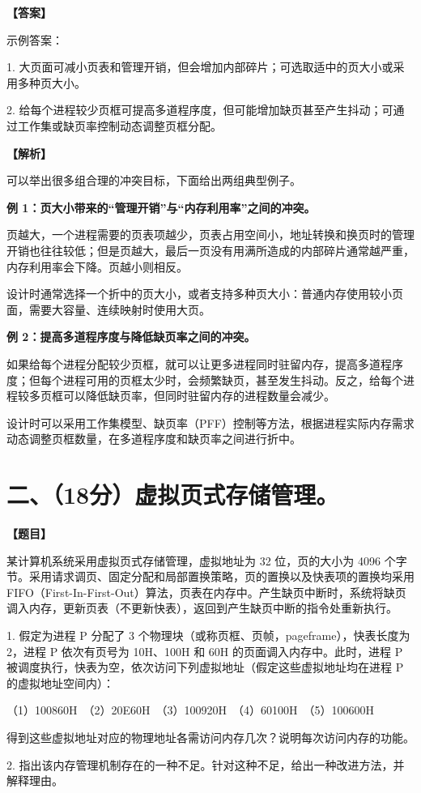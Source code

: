 \documentclass[UTF8,12pt]{ctexart}
\newenvironment{question}{\par\medskip\noindent\textbf{【题目】}\par\smallskip}{\par\medskip}
\newenvironment{explanation}{\par\noindent\textbf{【解析】}\par\smallskip}{\par\medskip}
\newenvironment{answer}{\par\noindent\textbf{【答案】}\par\smallskip}{\par}
\begin{document}
\begin{answer}
示例答案：

1. 大页面可减小页表和管理开销，但会增加内部碎片；可选取适中的页大小或采用多种页大小。

2. 给每个进程较少页框可提高多道程序度，但可能增加缺页甚至产生抖动；可通过工作集或缺页率控制动态调整页框分配。
\end{answer}

\begin{explanation}
可以举出很多组合理的冲突目标，下面给出两组典型例子。

\textbf{例 1：页大小带来的“管理开销”与“内存利用率”之间的冲突。}

页越大，一个进程需要的页表项越少，页表占用空间小，地址转换和换页时的管理开销也往往较低；但是页越大，最后一页没有用满所造成的内部碎片通常越严重，内存利用率会下降。页越小则相反。

设计时通常选择一个折中的页大小，或者支持多种页大小：普通内存使用较小页面，需要大容量、连续映射时使用大页。

\textbf{例 2：提高多道程序度与降低缺页率之间的冲突。}

如果给每个进程分配较少页框，就可以让更多进程同时驻留内存，提高多道程序度；但每个进程可用的页框太少时，会频繁缺页，甚至发生抖动。反之，给每个进程较多页框可以降低缺页率，但同时驻留内存的进程数量会减少。

设计时可以采用工作集模型、缺页率（PFF）控制等方法，根据进程实际内存需求动态调整页框数量，在多道程序度和缺页率之间进行折中。
\end{explanation}

\section*{二、（18分）虚拟页式存储管理。}

\begin{question}
某计算机系统采用虚拟页式存储管理，虚拟地址为 32 位，页的大小为 4096 个字节。采用请求调页、固定分配和局部置换策略，页的置换以及快表项的置换均采用 FIFO（First-In-First-Out）算法，页表在内存中。产生缺页中断时，系统将缺页调入内存，更新页表（不更新快表），返回到产生缺页中断的指令处重新执行。

1. 假定为进程 P 分配了 3 个物理块（或称页框、页帧，pageframe），快表长度为 2，进程 P 依次有页号为 10H、100H 和 60H 的页面调入内存中。此时，进程 P 被调度执行，快表为空，依次访问下列虚拟地址（假定这些虚拟地址均在进程 P 的虚拟地址空间内）：

（1）100860H　（2）20E60H　（3）100920H　（4）60100H　（5）100600H

得到这些虚拟地址对应的物理地址各需访问内存几次？说明每次访问内存的功能。

2. 指出该内存管理机制存在的一种不足。针对这种不足，给出一种改进方法，并解释理由。
\end{question}
\end{document}
